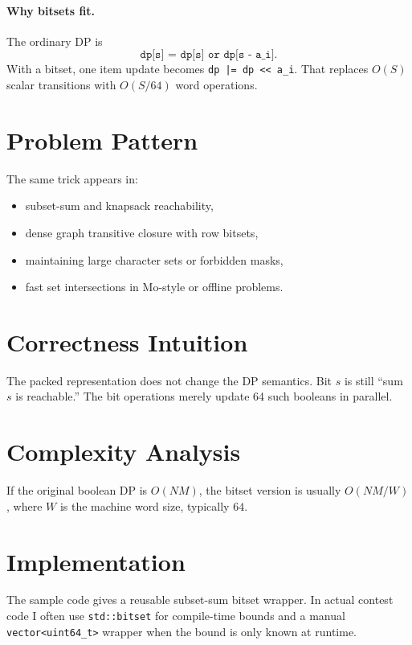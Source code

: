 \paragraph{Why bitsets fit.}
The ordinary DP is
\[
\texttt{dp[s] = dp[s] or dp[s - a_i]}.
\]
With a bitset, one item update becomes \texttt{dp |= dp << a\_i}. That replaces \(O(S)\) scalar transitions with
\(O(S / 64)\) word operations.

\section*{Problem Pattern}

The same trick appears in:

\begin{itemize}
  \item subset-sum and knapsack reachability,
  \item dense graph transitive closure with row bitsets,
  \item maintaining large character sets or forbidden masks,
  \item fast set intersections in Mo-style or offline problems.
\end{itemize}

\section*{Correctness Intuition}

The packed representation does not change the DP semantics. Bit \(s\) is still ``sum \(s\) is reachable.'' The bit
operations merely update 64 such booleans in parallel.

\section*{Complexity Analysis}

If the original boolean DP is \(O(NM)\), the bitset version is usually \(O(NM / W)\), where \(W\) is the machine word
size, typically \(64\).

\section*{Implementation}

The sample code gives a reusable subset-sum bitset wrapper. In actual contest code I often use \texttt{std::bitset} for
compile-time bounds and a manual \texttt{vector<uint64\_t>} wrapper when the bound is only known at runtime.

